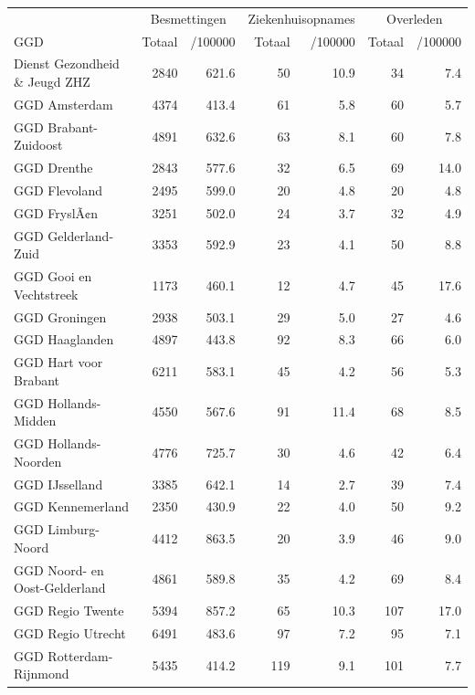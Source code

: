 \documentclass[
  english,
  man,floatsintext]{apa6}
\begin{document}
\begin{table}[H]
\centering\begingroup\fontsize{10}{12}\selectfont

\begin{threeparttable}
\begin{tabular}{lrrrrrr}
\toprule
\multicolumn{1}{c}{ } & \multicolumn{2}{c}{Besmettingen} & \multicolumn{2}{c}{Ziekenhuisopnames} & \multicolumn{2}{c}{Overleden} \\
\cmidrule(l{3pt}r{3pt}){2-3} \cmidrule(l{3pt}r{3pt}){4-5} \cmidrule(l{3pt}r{3pt}){6-7}
GGD & Totaal & /100000 & Totaal & /100000 & Totaal & /100000\\
\midrule
Dienst Gezondheid \& Jeugd ZHZ & 2840 & 621.6 & 50 & 10.9 & 34 & 7.4\\
GGD Amsterdam & 4374 & 413.4 & 61 & 5.8 & 60 & 5.7\\
GGD Brabant-Zuidoost & 4891 & 632.6 & 63 & 8.1 & 60 & 7.8\\
GGD Drenthe & 2843 & 577.6 & 32 & 6.5 & 69 & 14.0\\
GGD Flevoland & 2495 & 599.0 & 20 & 4.8 & 20 & 4.8\\
GGD FryslÃ¢n & 3251 & 502.0 & 24 & 3.7 & 32 & 4.9\\
GGD Gelderland-Zuid & 3353 & 592.9 & 23 & 4.1 & 50 & 8.8\\
GGD Gooi en Vechtstreek & 1173 & 460.1 & 12 & 4.7 & 45 & 17.6\\
GGD Groningen & 2938 & 503.1 & 29 & 5.0 & 27 & 4.6\\
GGD Haaglanden & 4897 & 443.8 & 92 & 8.3 & 66 & 6.0\\
GGD Hart voor Brabant & 6211 & 583.1 & 45 & 4.2 & 56 & 5.3\\
GGD Hollands-Midden & 4550 & 567.6 & 91 & 11.4 & 68 & 8.5\\
GGD Hollands-Noorden & 4776 & 725.7 & 30 & 4.6 & 42 & 6.4\\
GGD IJsselland & 3385 & 642.1 & 14 & 2.7 & 39 & 7.4\\
GGD Kennemerland & 2350 & 430.9 & 22 & 4.0 & 50 & 9.2\\
GGD Limburg-Noord & 4412 & 863.5 & 20 & 3.9 & 46 & 9.0\\
GGD Noord- en Oost-Gelderland & 4861 & 589.8 & 35 & 4.2 & 69 & 8.4\\
GGD Regio Twente & 5394 & 857.2 & 65 & 10.3 & 107 & 17.0\\
GGD Regio Utrecht & 6491 & 483.6 & 97 & 7.2 & 95 & 7.1\\
GGD Rotterdam-Rijnmond & 5435 & 414.2 & 119 & 9.1 & 101 & 7.7\\

\end{tabular}
\end{threeparttable}
\end{table}
\end{document}
